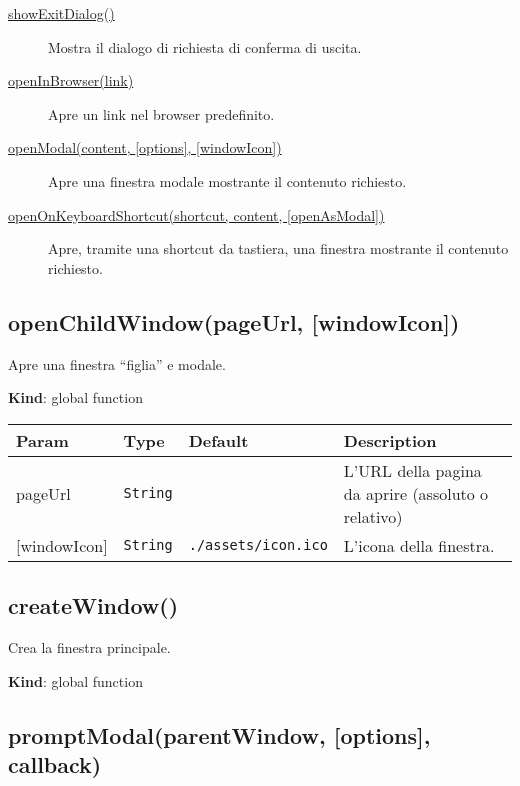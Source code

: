 \begin{description}
\item[{ \protect\hyperlink{showExitDialog}{showExitDialog()} }]
Mostra il dialogo di richiesta di conferma di uscita.
\item[{ \protect\hyperlink{openInBrowser}{openInBrowser(link)} }]
Apre un link nel browser predefinito.
\item[{ \protect\hyperlink{openModal}{openModal(content, {[}options{]},
{[}windowIcon{]})} }]
Apre una finestra modale mostrante il contenuto richiesto.
\item[{
\protect\hyperlink{openOnKeyboardShortcut}{openOnKeyboardShortcut(shortcut,
content, {[}openAsModal{]})} }]
Apre, tramite una shortcut da tastiera, una finestra mostrante il
contenuto richiesto.
\end{description}

\protect\hypertarget{openChildWindow}{}{}

\hypertarget{openchildwindowpageurl-windowicon}{%
\subsection{openChildWindow(pageUrl,
{[}windowIcon{]})}\label{openchildwindowpageurl-windowicon}}

Apre una finestra ``figlia'' e modale.

\textbf{Kind}: global function

\begin{tabularx}{\textwidth}{XXXX}
\toprule
Param & Type & Default & Description\tabularnewline
\midrule
\endhead
pageUrl & \texttt{String} & & L'URL della pagina da aprire (assoluto o
relativo)\tabularnewline
{[}windowIcon{]} & \texttt{String} & \texttt{./assets/icon.ico} &
L'icona della finestra.\tabularnewline
\bottomrule
\end{tabularx}

\protect\hypertarget{createWindow}{}{}

\hypertarget{createwindow}{%
\subsection{createWindow()}\label{createwindow}}

Crea la finestra principale.

\textbf{Kind}: global function\\
\protect\hypertarget{promptModal}{}{}

\hypertarget{promptmodalparentwindow-options-callback}{%
\subsection{promptModal(parentWindow, {[}options{]},
callback)}\label{promptmodalparentwindow-options-callback}}

